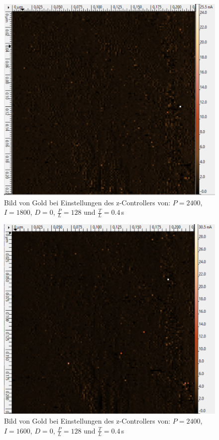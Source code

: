 \begin{figure}[ht]
	\includegraphics[scale=0.5]{Bild/Para/P7}
	\centering
	\caption[Parameter Änderung 7]{Bild von Gold bei Einstellungen des z-Controllers von: $P=2400$, $I=1800$, $D=0$, $\frac{P}{L}=128$ und $\frac{T}{L}=0.4\,$s}
\end{figure}
\begin{figure}[ht]
	\includegraphics[scale=0.5]{Bild/Para/P8}
	\centering
	\caption[Parameter Änderung 8]{Bild von Gold bei Einstellungen des z-Controllers von: $P=2400$, $I=1600$, $D=0$, $\frac{P}{L}=128$ und $\frac{T}{L}=0.4\,$s}
\end{figure}
